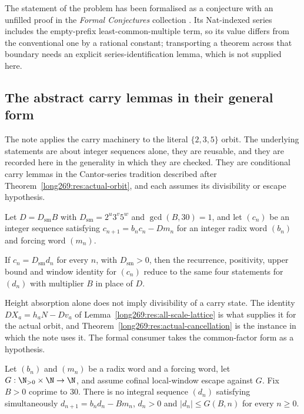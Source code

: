 The statement of the problem has been formalised as a conjecture with an
unfilled proof in the \emph{Formal Conjectures} collection
\cite{formalconjectures269}.  Its Nat-indexed series includes the empty-prefix
least-common-multiple term, so its value differs from the conventional one by a
rational constant; transporting a theorem across that boundary needs an
explicit series-identification lemma, which is not supplied here.

\subsection{The abstract carry lemmas in their general form}
\label{long269:long:general-carries}

The note applies the carry machinery to the literal $\{2,3,5\}$ orbit.  The
underlying statements are about integer sequences alone, they are reusable, and
they are recorded here in the generality in which they are checked.  They are
conditional carry lemmas in the Cantor-series tradition described after
Theorem~\ref{long269:res:actual-orbit}, and each assumes its divisibility or
escape hypothesis.

Let $D=D_{\mathrm{sm}}B$ with $D_{\mathrm{sm}}=2^{u}3^{v}5^{w}$ and
$\gcd(B,30)=1$, and let $(c_n)$ be an integer sequence satisfying
$c_{n+1}=b_nc_n-Dm_n$ for an integer radix word $(b_n)$ and forcing word
$(m_n)$.

\begin{proposition}
\label{long269:long:denominator-reduction}
If $c_n=D_{\mathrm{sm}}d_n$ for every $n$, with $D_{\mathrm{sm}}>0$, then the
recurrence, positivity, upper bound and window identity for $(c_n)$ reduce to
the same four statements for $(d_n)$ with multiplier $B$ in place of $D$.
\end{proposition}

Height absorption alone does not imply divisibility of a carry state.  The
identity $DX_a=h_aN-Dv_a$ of Lemma~\ref{long269:res:all-scale-lattice} is what supplies
it for the actual orbit, and Theorem~\ref{long269:res:actual-cancellation} is the
instance in which the note uses it.  The formal consumer takes the
common-factor form as a hypothesis.

\begin{proposition}
\label{long269:long:windowconsumer}
Let $(b_n)$ and $(m_n)$ be a radix word and a forcing word, let
$G:\N_{>0}\times\N\to\N$, and assume cofinal local-window escape against $G$.
Fix $B>0$ coprime to $30$.  There is no integral sequence $(d_n)$ satisfying
simultaneously $d_{n+1}=b_nd_n-Bm_n$, $d_n>0$ and $|d_n|\le G(B,n)$ for every
$n\ge0$.
\end{proposition}

